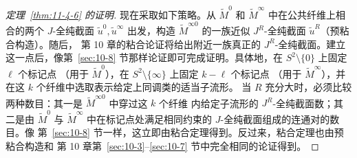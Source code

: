 \begin{proof}[定理~\ref{thm:11-4-6} 的证明]
现在采取如下策略。从 $\widetilde M^0$ 和 $\widetilde M^\infty$ 中在公共纤维上相合的两个
$J$-全纯截面 $\widetilde u^0,\widetilde u^\infty$ 出发，构造
$\widetilde M^{\infty0}$ 的一族近似 $J^R$-全纯截面 $\widetilde u^R$（预粘合构造）。随后，
第 10 章的粘合论证将给出附近一族真正的 $J^R$-全纯截面。建立这一点后，像第~\ref{sec:10-8}
节那样论证即可完成证明。具体地，在 $S^2\setminus\{0\}$ 上固定 $\ell$ 个标记点
（用于 $\widetilde M^0$），在 $S^2\setminus\{\infty\}$ 上固定 $k-\ell$ 个标记点
（用于 $\widetilde M^\infty$），并在这 $k$ 个纤维中选取表示给定上同调类的适当子流形。
当 $R$ 充分大时，必须比较两种数目：其一是 $\widetilde M^{\infty0}$ 中穿过这 $k$ 个纤维
内给定子流形的 $J^R$-全纯截面数；其二是由 $\widetilde M^0$ 与
$\widetilde M^\infty$ 中在标记点处满足相同约束的 $J$-全纯截面组成的连通对的数目。像
第~\ref{sec:10-8} 节一样，这立即由粘合定理得到。反过来，粘合定理也由预粘合构造和
第 10 章第~\ref{sec:10-3}--\ref{sec:10-7} 节中完全相同的论证得到。


\end{proof}
